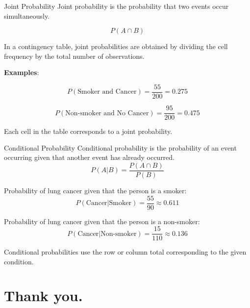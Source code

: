 \documentclass[12pt, aspectratio=169]{beamer}
\begin{document}
	\begin{frame}{Joint Probability}
		Joint probability is the probability that two events occur simultaneously.

		\[
		P(A \cap B)
		\]

		In a contingency table, joint probabilities are obtained by dividing the cell frequency by the total number of observations.

		\textbf{Examples}:

		\[
		P(\text{Smoker and Cancer}) = \frac{55}{200} = 0.275
		\]

		\[
		P(\text{Non-smoker and No Cancer}) = \frac{95}{200} = 0.475
		\]

		Each cell in the table corresponds to a joint probability.
	\end{frame}


	\begin{frame}{Conditional Probability}
		Conditional probability is the probability of an event occurring given that another event has already occurred.
		\[
		P(A|B) = \frac{P(A \cap B)}{P(B)}
		\]

		Probability of lung cancer given that the person is a smoker:
		\[
		P(\text{Cancer}|\text{Smoker}) =
		\frac{55}{90} \approx 0.611
		\]

		Probability of lung cancer given that the person is a non-smoker:
		\[
		P(\text{Cancer}|\text{Non-smoker}) =
		\frac{15}{110} \approx 0.136
		\]

		Conditional probabilities use the row or column total corresponding to the given condition.
	\end{frame}


	\section*{Thank you.}
\end{document}
